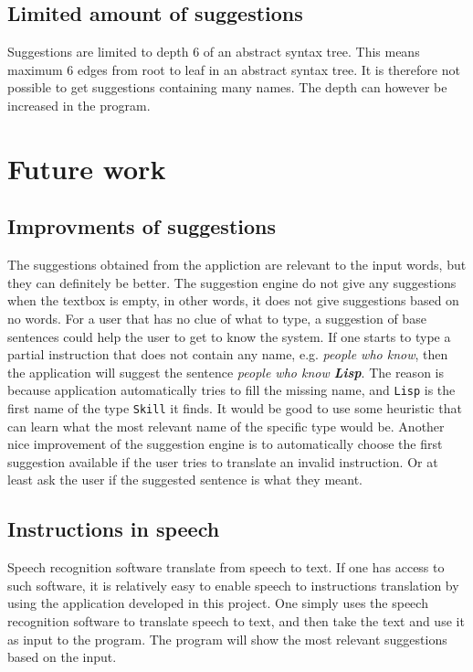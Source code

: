 \subsection*{Limited amount of suggestions}
Suggestions are limited to depth 6 of an abstract syntax tree. This means maximum 6 edges from root to leaf in an abstract syntax tree. It is therefore not possible to get suggestions containing many names. The depth can however be increased in the program.

\section{Future work}
\subsection*{Improvments of suggestions}
The suggestions obtained from the appliction are relevant to the input words, but they can definitely be better. The suggestion engine do not give any suggestions when the textbox is empty, in other words, it does not give suggestions based on no words. For a user that has no clue of what to type, a suggestion of base sentences could help the user to get to know the system.
\newline
\newline
If one starts to type a partial instruction that does not contain any name, e.g. \emph{people who know}, then the application will suggest the sentence \emph{people who know \textbf{Lisp}}. The reason is because application automatically tries to fill the missing name, and \texttt{Lisp} is the first name of the type \texttt{Skill} it finds. It would be good to use some heuristic that can learn what the most relevant name of the specific type would be.
\newline
\newline
Another nice improvement of the suggestion engine is to automatically choose the first suggestion available if the user tries to translate an invalid instruction. Or at least ask the user if the suggested sentence is what they meant.

\subsection*{Instructions in speech}
Speech recognition software translate from speech to text. If one has access to such software, it is relatively easy to enable speech to instructions translation by using the application developed in this project. One simply uses the speech recognition software to translate speech to text, and then take the text and use it as input to the program. The program will show the most relevant suggestions based on the input.

